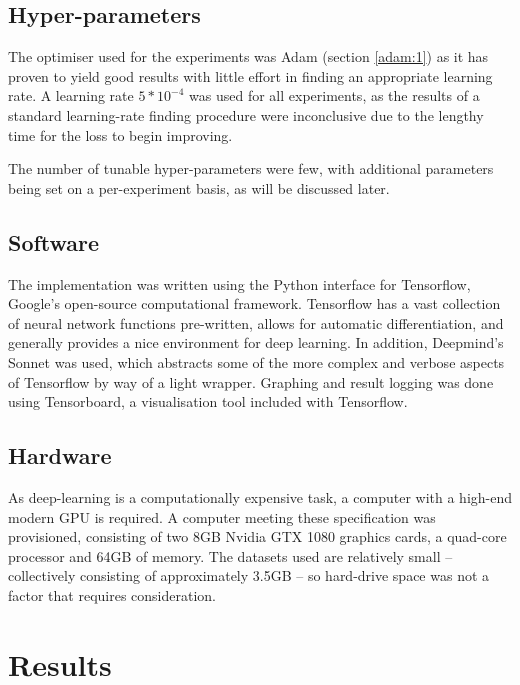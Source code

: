\documentclass{report}
\begin{document}
\section{Hyper-parameters}
The optimiser used for the experiments was Adam (section \ref{adam:1}) as it has proven to yield good results with little effort in finding an appropriate learning rate. A learning rate $5*10^{-4}$ was used for all experiments, as the results of a standard learning-rate finding procedure were inconclusive due to the lengthy time for the loss to begin improving. \par
The number of tunable hyper-parameters were few, with additional parameters being set on a per-experiment basis, as will be discussed later. \par

\section{Software}
The implementation was written using the Python interface for Tensorflow\parencite{tensorflow}, Google's open-source computational framework. Tensorflow has a vast collection of neural network functions pre-written, allows for automatic differentiation, and generally provides a nice environment for deep learning. In addition, Deepmind's Sonnet\parencite{sonnet} was used, which abstracts some of the more complex and verbose aspects of Tensorflow by way of a light wrapper. Graphing and result logging was done using Tensorboard, a visualisation tool included with Tensorflow. \par

\section{Hardware}
As deep-learning is a computationally expensive task, a computer with a high-end modern GPU is required. A computer meeting these specification was provisioned, consisting of two 8GB Nvidia GTX 1080 graphics cards, a quad-core processor and 64GB of memory. The datasets used are relatively small -- collectively consisting of approximately 3.5GB -- so hard-drive space was not a factor that requires consideration.  \par


\chapter{Results} \label{results-chapter}
\end{document}
